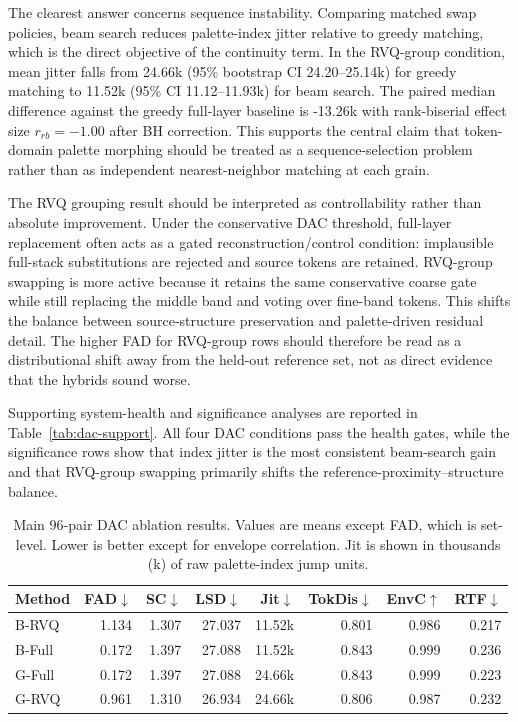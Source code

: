 \documentclass[twoside,a4paper]{article}
\begin{document}
The clearest answer concerns sequence instability. Comparing matched swap policies, beam search reduces palette-index jitter relative to greedy matching, which is the direct objective of the continuity term. In the RVQ-group condition, mean jitter falls from 24.66k (95\% bootstrap CI 24.20--25.14k) for greedy matching to 11.52k (95\% CI 11.12--11.93k) for beam search. The paired median difference against the greedy full-layer baseline is -13.26k with rank-biserial effect size $r_{rb}=-1.00$ after BH correction. This supports the central claim that token-domain palette morphing should be treated as a sequence-selection problem rather than as independent nearest-neighbor matching at each grain.

The RVQ grouping result should be interpreted as controllability rather than absolute improvement. Under the conservative DAC threshold, full-layer replacement often acts as a gated reconstruction/control condition: implausible full-stack substitutions are rejected and source tokens are retained. RVQ-group swapping is more active because it retains the same conservative coarse gate while still replacing the middle band and voting over fine-band tokens. This shifts the balance between source-structure preservation and palette-driven residual detail. The higher FAD for RVQ-group rows should therefore be read as a distributional shift away from the held-out reference set, not as direct evidence that the hybrids sound worse.

Supporting system-health and significance analyses are reported in Table~\ref{tab:dac-support}. All four DAC conditions pass the health gates, while the significance rows show that index jitter is the most consistent beam-search gain and that RVQ-group swapping primarily shifts the reference-proximity--structure balance.

\begin{table}[!t]
    \centering
    \scriptsize
    \setlength{\tabcolsep}{1.4pt}
    \caption{Main 96-pair DAC ablation results. Values are means except FAD, which is set-level. Lower is better except for envelope correlation. Jit is shown in thousands (k) of raw palette-index jump units.}
    \label{tab:dac-main}
    \begin{tabular}{lrrrrrrr}
    \toprule
    Method & FAD$\downarrow$ & SC$\downarrow$ & LSD$\downarrow$ & Jit$\downarrow$ & TokDis$\downarrow$ & EnvC$\uparrow$ & RTF$\downarrow$ \\
    \midrule
    B-RVQ & 1.134 & 1.307 & 27.037 & 11.52k & 0.801 & 0.986 & 0.217 \\
    B-Full & 0.172 & 1.397 & 27.088 & 11.52k & 0.843 & 0.999 & 0.236 \\
    G-Full & 0.172 & 1.397 & 27.088 & 24.66k & 0.843 & 0.999 & 0.223 \\
    G-RVQ & 0.961 & 1.310 & 26.934 & 24.66k & 0.806 & 0.987 & 0.232 \\
    \bottomrule
    \end{tabular}
\end{table}
\end{document}
